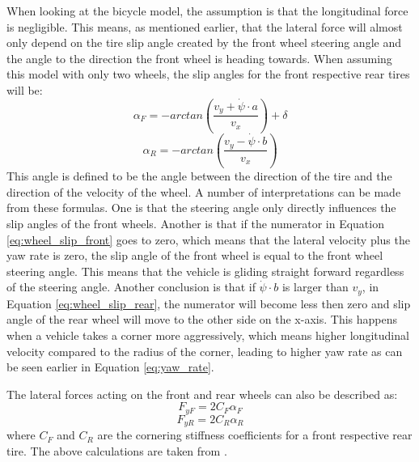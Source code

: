 When looking at the bicycle model, the assumption is that the longitudinal force is negligible. This means, as mentioned earlier, that the lateral force will almost only depend on the tire slip angle created by the front wheel steering angle and the angle to the direction the front wheel is heading towards. When assuming this model with only two wheels, the slip angles for the front respective rear tires will be:
\begin{equation} \label{eq:wheel_slip_front}
	\alpha _{F} = -arctan(\dfrac{v_{y} + \dot \psi  \cdot a}{v_{x}}) + \delta
\end{equation}
\begin{equation} \label{eq:wheel_slip_rear}
\alpha _{R} = -arctan(\dfrac{v_{y} - \dot \psi  \cdot b}{v_{x}})
\end{equation}
This angle is defined to be the angle between the direction of the tire and the direction of the velocity of the wheel. A number of interpretations can be made from these formulas. One is that the steering angle only directly influences the slip angles of the front wheels. Another is that if the numerator in Equation \ref{eq:wheel_slip_front} goes to zero, which means that the lateral velocity plus the yaw rate is zero, the slip angle of the front wheel is equal to the front wheel steering angle. This means that the vehicle is gliding straight forward regardless of the steering angle. Another conclusion is that if $ \dot \psi \cdot b $ is larger than $ v_{y} $, in Equation \ref{eq:wheel_slip_rear}, the numerator will become less then zero and slip angle of the rear wheel will move to the other side on the x-axis. This happens when a vehicle takes a corner more aggressively, which means higher longitudinal velocity compared to the radius of the corner, leading to higher yaw rate as can be seen earlier in Equation \ref{eq:yaw_rate}.

The lateral forces acting on the front and rear wheels can also be described as: 
\begin{equation}
	F_{yF} = 2C_{F}\alpha _{F}
\end{equation}
\begin{equation}
	F_{yR} = 2C_{R}\alpha _{R}
\end{equation}
where $ C_{F} $ and $ C_{R} $ are the cornering stiffness coefficients for a front respective rear tire. The above calculations are taken from \cite{rajamani}. 

